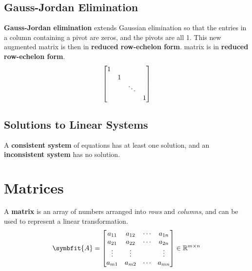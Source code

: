 \documentclass{article}
\begin{document}
	\subsection{Gauss-Jordan Elimination}
	\begin{definition}
		\textbf{Gauss-Jordan elimination} extends Gaussian elimination so that the entries in a column containing a pivot are zeros, and the pivots are all 1. This new augmented matrix is then in \textbf{reduced row-echelon form}. matrix is in \textbf{reduced row-echelon form}.
		\begin{equation*}
			\mqty[
				1 &   &        & \\
				  & 1 &        & \\
				  &   & \ddots & \\
				  &   &        & 1]
		\end{equation*}
	\end{definition}
	\subsection{Solutions to Linear Systems}
	\begin{definition}
		A \textbf{consistent system} of equations has at least one solution, and an \linebreak \textbf{inconsistent system} has no solution. 
	\end{definition}
	\newpage
\section{Matrices}
	\begin{definition}
		A \textbf{matrix} is an array of numbers arranged into \textit{rows} and \textit{columns}, and can be used to represent a linear transformation.
		\begin{equation*}
			\symbfit{A} = \mqty[
				a_{11} & a_{12} & \cdots & a_{1n} \\
				a_{21} & a_{22} & \cdots & a_{2n} \\
				\vdots & \vdots &        & \vdots \\
				a_{m1} & a_{m2} & \cdots & a_{mn} \\
				] \in \mathbb{R}^{m \times n}
		\end{equation*}
	\end{definition}
\end{document}
